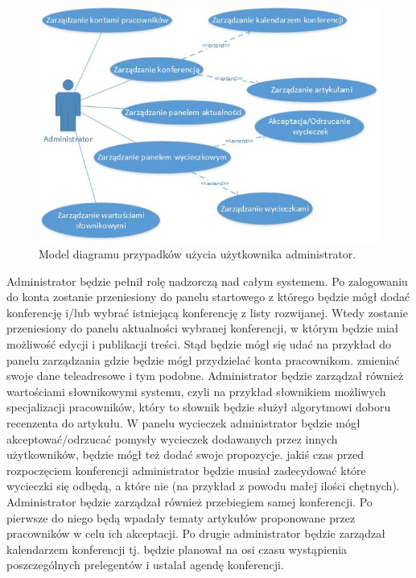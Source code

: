 \begin{figure}[!tb]
    \centering
    \includegraphics{administrator.jpg}
    \caption{Model diagramu przypadków użycia użytkownika administrator.}
    \label{fig:administrator}
\end{figure}

Administrator będzie pełnił rolę nadzorczą nad całym systemem. Po zalogowaniu do konta zostanie przeniesiony do panelu startowego z którego będzie mógł dodać konferencję i/lub wybrać istniejącą konferencję z listy rozwijanej. Wtedy zostanie przeniesiony do panelu aktualności wybranej konferencji, w którym będzie miał możliwość edycji i publikacji treści. \newline
Stąd będzie mógł się udać na przykład do panelu zarządzania gdzie będzie mógł przydzielać konta pracownikom. zmieniać swoje dane teleadresowe i tym podobne. \newline
Administrator będzie zarządzał również wartościami słownikowymi systemu, czyli na przykład słownikiem możliwych specjalizacji pracowników, który to słownik będzie służył algorytmowi doboru recenzenta do artykułu. \newline
W panelu wycieczek administrator będzie mógł akceptować/odrzucać pomysły wycieczek dodawanych przez innych użytkowników, będzie mógł też dodać swoje propozycje. jakiś czas przed rozpoczęciem konferencji administrator będzie musiał zadecydować które wycieczki się odbędą, a które nie (na przykład z powodu małej ilości chętnych). \newline
Administrator będzie zarządzał również przebiegiem samej konferencji. Po pierwsze do niego będą wpadały tematy artykułów proponowane przez pracowników w celu ich akceptacji. Po drugie administrator będzie zarządzał kalendarzem konferencji tj. będzie planował na osi czasu wystąpienia poszczególnych prelegentów i ustalał agendę konferencji.



